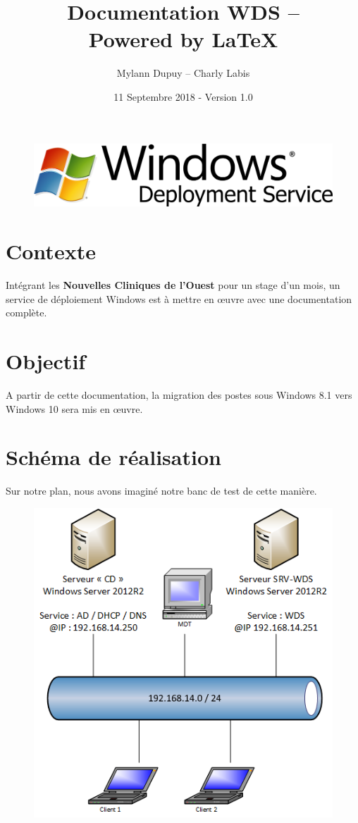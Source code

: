 \documentclass[11pt,a4paper,oneside]{article}
\author{Mylann Dupuy -- Charly Labis}
\title{Documentation WDS --  \\ Powered by \LaTeX}
\date{11 Septembre 2018 - Version 1.0}
\begin{document}
\maketitle
\begin{figure}[hbtp]
\centering
\includegraphics[scale=1]{Pictures/bannierewds.png}
\end{figure}
\newpage

\tableofcontents
\newpage
\setcounter{page}{3}
\newpage

\section{Contexte}
Intégrant les \textbf{Nouvelles Cliniques de l'Ouest} pour un stage d'un mois, un service de déploiement Windows est à mettre en \oe{}uvre avec une documentation complète.

\section{Objectif}
A partir de cette documentation, la migration des postes sous Windows 8.1 vers Windows 10 sera mis en \oe{}uvre.

\section{Schéma de réalisation}
Sur notre plan, nous avons imaginé notre banc de test de cette manière. \\ 
\begin{figure}[hbtp]
\centering
\includegraphics[scale=1.2]{Pictures/Plan.png}
\end{figure}
\newpage
\end{document}
